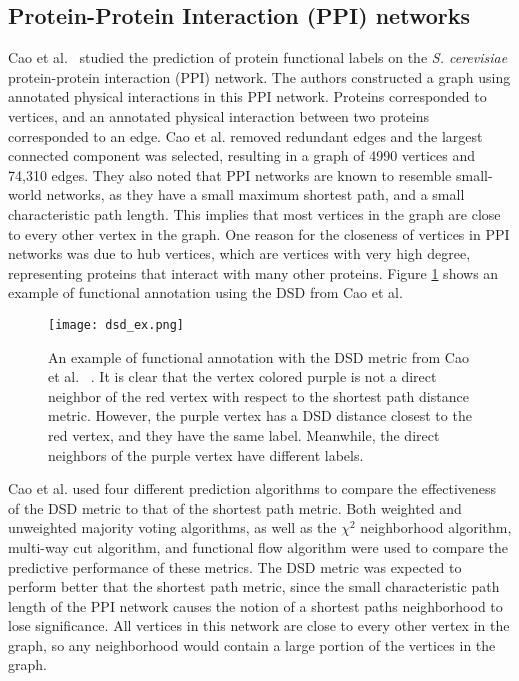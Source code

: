\subsection{Protein-Protein Interaction (PPI) networks}
Cao et al.~\cite{10.1371/journal.pone.0076339} studied the prediction of protein
functional labels on the \emph{S. cerevisiae} protein-protein interaction (PPI) network. The
authors constructed a graph using annotated physical interactions in this PPI network. Proteins
corresponded to vertices, and an annotated physical interaction between two proteins corresponded to
an edge. Cao et al. removed redundant edges and the largest connected component was selected,
resulting in a graph of 4990 vertices and 74,310 edges. They also noted that PPI networks are known
to resemble small-world networks, as they have a small maximum shortest path, and a small
characteristic path length. This implies that most vertices in the graph are close to every other
vertex in the graph. One reason for the closeness of vertices in PPI networks was due to hub vertices, which are vertices with very high degree, representing proteins that interact with many other proteins. Figure \ref{fig:PPI_example} shows an example of functional annotation using
the DSD from Cao et al.

\begin{figure}[h] \centering \texttt{[image: dsd\_ex.png]}
\caption{An example of functional annotation with the DSD metric from Cao et al.
~\cite{10.1371/journal.pone.0076339}. It is clear that the vertex colored purple is not a direct
neighbor of the red vertex with respect to the shortest path distance metric. However, the purple
vertex has a DSD distance closest to the red vertex, and they have the same label. Meanwhile, the
direct neighbors of the purple vertex have different labels.}
\label{fig:PPI_example}
\end{figure}

Cao et al. used four different prediction algorithms to compare the effectiveness of the DSD metric
to that of the shortest path metric. Both weighted and unweighted majority voting algorithms, as
well as the $\chi^{2}$ neighborhood algorithm, multi-way cut algorithm, and functional flow
algorithm were used to compare the predictive performance of these metrics. The DSD metric was
expected to perform better that the shortest path metric, since the small characteristic path length
of the PPI network causes the notion of a shortest paths neighborhood to lose significance. All
vertices in this network are close to every other vertex in the graph, so any neighborhood would
contain a large portion of the vertices in the graph.

